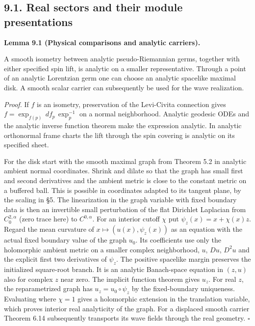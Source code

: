 \documentclass[
  english,
  11pt,
  reqno]{amsart}
\makeatletter
\newcommand{\pandocstatementheading}[1]{%
  \par\addpenalty{\@beginparpenalty}%
  \addvspace{.5\baselineskip plus .2\baselineskip minus .2\baselineskip}%
  {\normalfont\bfseries #1\par}%
  \nobreak\@afterindenttrue\@afterheading
}
\makeatother
\begin{document}
\subsection{9.1. Real sectors and their module
presentations}\label{real-sectors-and-their-module-presentations}\label{sec:analytic-sector-restriction}

\pandocstatementheading{\leavevmode{}\label{lem:analytic-physical-maps-and-carrier}Lemma 9.1 (Physical comparisons and analytic carriers).}

A smooth isometry between analytic pseudo-Riemannian germs, together
with either specified spin lift, is analytic on a smaller
representative. Through a point of an analytic Lorentzian germ one can
choose an analytic spacelike maximal disk. A smooth scalar carrier can
subsequently be used for the wave realization.

\emph{Proof.} If \(f\) is an isometry, preservation of the Levi-Civita
connection gives \(f=\exp_{f(p)}\,d f_p\,\exp_p^{-1}\) on a normal
neighborhood. Analytic geodesic ODEs and the analytic inverse function
theorem make the expression analytic. In analytic orthonormal frame
charts the lift through the spin covering is analytic on its specified
sheet.

For the disk start with the smooth maximal graph from Theorem 5.2 in
analytic ambient normal coordinates. Shrink and dilate so that the graph
has small first and second derivatives and the ambient metric is close
to the constant metric on a buffered ball. This is possible in
coordinates adapted to its tangent plane, by the scaling in §5. The
linearization in the graph variable with fixed boundary data is then an
invertible small perturbation of the flat Dirichlet Laplacian from
\(C^{2,\alpha}_0\) (zero trace here) to \(C^{0,\alpha}\). For an
interior cutoff \(\chi\) put \(\psi_z(x)=x+\chi(x)z\). Regard the mean
curvature of \(x\mapsto(u(x),\psi_z(x))\) as an equation with the actual
fixed boundary value of the graph \(u_0\). Its coefficients use only the
holomorphic ambient metric on a smaller complex neighborhood, \(u\),
\(Du\), \(D^2u\) and the explicit first two derivatives of \(\psi_z\).
The positive spacelike margin preserves the initialized square-root
branch. It is an analytic Banach-space equation in \((z,u)\) also for
complex \(z\) near zero. The implicit function theorem gives \(u_z\).
For real \(z\), the reparametrized graph has \(u_z=u_0\circ\psi_z\) by
the fixed-boundary uniqueness. Evaluating where \(\chi=1\) gives a
holomorphic extension in the translation variable, which proves interior
real analyticity of the graph. For a displaced smooth carrier Theorem
6.14 subsequently transports its wave fields through the real geometry.
\hfill\(\square\)
\end{document}
